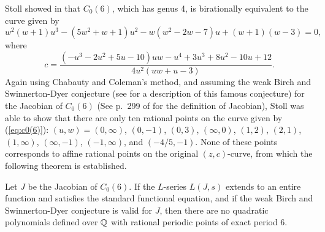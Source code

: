 Stoll showed in \cite{MR2465796} that $C_0(6)$, which has genus 4, is
birationally equivalent to the curve given by
\begin{equation}
  \label{eq:c0(6)}
  w^2(w+1)u^3 - (5w^2+w+1)u^2 - w(w^2-2w-7)u + (w+1)(w-3) = 0,
\end{equation}
where
\begin{equation}
  \label{eq:c-in-uw}
  c = \frac{(- u^3 - 2u^2 + 5u - 10)uw - u^4 + 3u^3 + 8u^2 - 10u +
    12}{4u^2(uw+u-3)}.
\end{equation}
Again using Chabauty and Coleman's method, and assuming the weak Birch
and Swinnerton-Dyer conjecture (see \cite{MR2238272} for a description
of this famous conjecture) for the Jacobian of $C_0(6)$ (See p.~299 of
\cite{MR1917232} for the definition of Jacobian), Stoll was able to
show that there are only ten rational points on the curve given by
(\ref{eq:c0(6)}): $(u, w) = (0, \infty)$, $(0, -1)$, $(0, 3)$,
$(\infty, 0)$, $(1, 2)$, $(2, 1)$, $(1, \infty)$, $(\infty, -1)$,
$(-1, \infty)$, and $(-4/5, -1)$. None of these points corresponds to
affine rational points on the original $(z, c)$-curve, from which the
following theorem is established.

\begin{theorem}
  Let $J$ be the Jacobian of $C_0(6)$. If the $L$-series $L(J,s)$
  extends to an entire function and satisfies the standard functional
  equation, and if the weak Birch and Swinnerton-Dyer conjecture is
  valid for $J$, then there are no quadratic polynomials defined over
  $\mathbb{Q}$ with rational periodic points of exact period 6.
\end{theorem}

